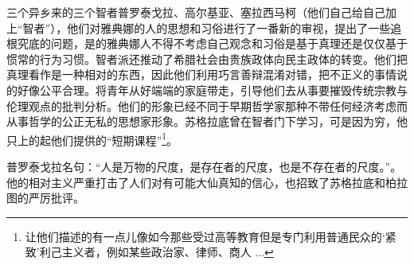 三个异乡来的三个智者普罗泰戈拉、高尔基亚、塞拉西马柯（他们自己给自己加上“智者”），他们对雅典娜的人的思想和习俗进行了一番新的审视，提出了一些追根究底的问题，是的雅典娜人不得不考虑自己观念和习俗是基于真理还是仅仅基于惯常的行为习惯。智者派还推动了希腊社会由贵族政体向民主政体的转变。他们把真理看作是一种相对的东西，因此他们利用巧言善辩混淆对错，把不正义的事情说的好像公平合理。将青年从好端端的家庭带走，引导他们去从事要摧毁传统宗教与伦理观点的批判分析。他们的形象已经不同于早期哲学家那种不带任何经济考虑而从事哲学的公正无私的思想家形象。苏格拉底曾在智者门下学习，可是因为穷，他只上的起他们提供的“短期课程”\footnote{让他们描述的有一点儿像如今那些受过高等教育但是专门利用普通民众的‘紧致’利己主义者，例如某些政治家、律师、商人 ... }。

普罗泰戈拉名句：“人是万物的尺度，是存在者的尺度，也是不存在者的尺度。”。 他的相对主义严重打击了人们对有可能大仙真知的信心，也招致了苏格拉底和柏拉图的严厉批评。










































